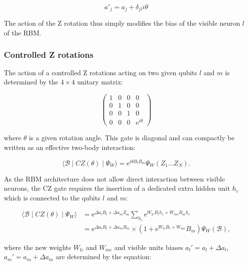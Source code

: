 \begin{equation}
    a\prime_{j} = a_{j} + \delta_{jl}i\theta
\end{equation}

The action of the Z rotation thus simply modifies the bias of the visible neuron $l$ of the RBM.

\subsubsection{Controlled Z rotations}
The action of a controlled Z rotations acting on two given qubits $l$ and $m$ is determined by
the $4\times4$ unitary matrix:

\begin{equation}
    \begin{pmatrix}
        1 & 0 & 0 & 0 \\
        0 & 1 & 0 & 0 \\
        0 & 0 & 1 & 0 \\
        0 & 0 & 0 & \mathrm{e}^{i\theta}
    \end{pmatrix}
\end{equation}

where $\theta$ is a given rotation angle. This gate is diagonal and can compactly be written as an 
effective two-body interaction:

\begin{equation}
    \langle \mathcal{B} \mid CZ(\theta) \mid \Psi_{W}  \rangle = 
    \mathrm{e}^{i\theta B_{l}B_{m}}\Psi_{W}(Z_{1} \dots Z_{N}).
\end{equation}

As the RBM architecture does not allow direct interaction between visible neurons, the CZ gate
requires the insertion of a dedicated extra hidden unit $h_{c}$ which is connected
to the qubits $l$ and $m$: 

\begin{align}
    \langle \mathcal{B} \mid CZ(\theta) \mid \Psi_{W}  \rangle &= 
    \mathrm{e}^{\Delta a_{l} B_{l} + \Delta a_{m} Z_{m}} \sum_{h_{c}}\mathrm{e}^{W_{lc} B_{l} h_{c} + W_{mc} B_{m} h_{c}} \\
    &= \mathrm{e}^{\Delta a_{l} B_{l} + \Delta a_{m} B_{m}} \times (1 + \mathrm{e}^{W_{lc} B_{l} + W_{mc}} B_{m}) \Psi_{W}(\mathcal{B}),
\end{align}

where the new weights $W_{lc}$ and $W_{mc}$ and visible units biases $a_{l}\prime= a_{l} + \Delta a_{l}$,
$a_{m}\prime= a_{m} + \Delta a_{m}$ are determined by the equation:

